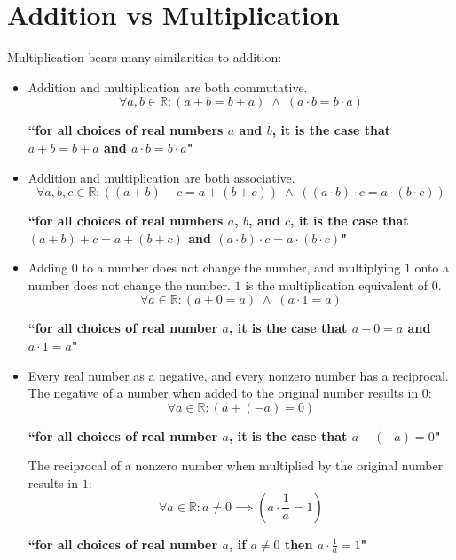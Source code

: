 \documentclass{article}
\begin{document}
\section*{Addition vs Multiplication}

Multiplication bears many similarities to addition:

\begin{itemize}
\item Addition and multiplication are both commutative.
\[\forall a, b \in \mathbb{R} : (a + b = b + a) \;\wedge\; (a \cdot b = b \cdot a)\]
\begin{center}\textbf{``for all choices of real numbers \(a\) and \(b\), it is the case that \(a + b = b + a\) and \(a \cdot b = b \cdot a\)"}\end{center}
\item Addition and multiplication are both associative.
\[\forall a, b, c \in \mathbb{R} : ((a + b) + c = a + (b + c)) \;\wedge\; ((a \cdot b) \cdot c = a \cdot (b \cdot c))\]
\begin{center}\textbf{``for all choices of real numbers \(a\), \(b\), and \(c\), it is the case that \((a + b) + c = a + (b + c)\) and \((a \cdot b) \cdot c = a \cdot (b \cdot c)\)"}\end{center}
\item Adding \(0\) to a number does not change the number, and multiplying \(1\) onto a number does not change the number. \(1\) is the multiplication equivalent of \(0\).
\[\forall a \in \mathbb{R} : (a + 0 = a) \;\wedge\; (a \cdot 1 = a)\]
\begin{center}\textbf{``for all choices of real number \(a\), it is the case that \(a + 0 = a\) and \(a \cdot 1 = a\)"}\end{center}
\item Every real number as a negative, and every nonzero number has a reciprocal. The negative of a number when added to the original number results in \(0\):
\[\forall a \in \mathbb{R} : (a + (-a) = 0)\]
\begin{center}\textbf{``for all choices of real number \(a\), it is the case that \(a + (-a) = 0\)"}\end{center}
The reciprocal of a nonzero number when multiplied by the original number results in \(1\):
\[\forall a \in \mathbb{R} : a \neq 0 \implies (a \cdot \frac{1}{a} = 1)\]
\begin{center}\textbf{``for all choices of real number \(a\), if \(a \neq 0\) then \(a \cdot \frac{1}{a} = 1\)"}\end{center}

\end{itemize}
\end{document}
